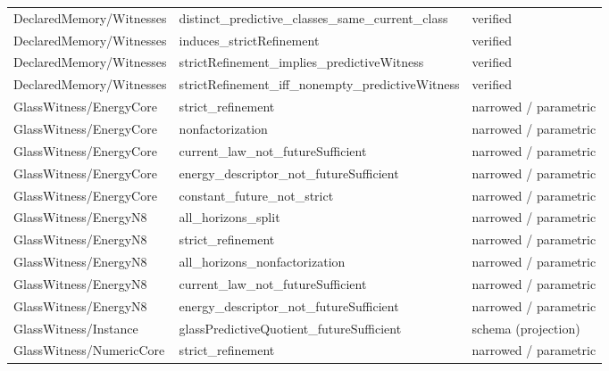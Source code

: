 \begin{longtable}{>{\raggedright\arraybackslash}p{3.6cm}>{\raggedright\arraybackslash}p{8.4cm}p{2.9cm}}
DeclaredMemory/\allowbreak{}Witnesses & distinct\_\allowbreak{}predictive\_\allowbreak{}classes\_\allowbreak{}same\_\allowbreak{}current\_\allowbreak{}class & verified \\
DeclaredMemory/\allowbreak{}Witnesses & induces\_\allowbreak{}strictRefinement & verified \\
DeclaredMemory/\allowbreak{}Witnesses & strictRefinement\_\allowbreak{}implies\_\allowbreak{}predictiveWitness & verified \\
DeclaredMemory/\allowbreak{}Witnesses & strictRefinement\_\allowbreak{}iff\_\allowbreak{}nonempty\_\allowbreak{}predictiveWitness & verified \\
GlassWitness/\allowbreak{}EnergyCore & strict\_\allowbreak{}refinement & narrowed / parametric \\
GlassWitness/\allowbreak{}EnergyCore & nonfactorization & narrowed / parametric \\
GlassWitness/\allowbreak{}EnergyCore & current\_\allowbreak{}law\_\allowbreak{}not\_\allowbreak{}futureSufficient & narrowed / parametric \\
GlassWitness/\allowbreak{}EnergyCore & energy\_\allowbreak{}descriptor\_\allowbreak{}not\_\allowbreak{}futureSufficient & narrowed / parametric \\
GlassWitness/\allowbreak{}EnergyCore & constant\_\allowbreak{}future\_\allowbreak{}not\_\allowbreak{}strict & narrowed / parametric \\
GlassWitness/\allowbreak{}EnergyN8 & all\_\allowbreak{}horizons\_\allowbreak{}split & narrowed / parametric \\
GlassWitness/\allowbreak{}EnergyN8 & strict\_\allowbreak{}refinement & narrowed / parametric \\
GlassWitness/\allowbreak{}EnergyN8 & all\_\allowbreak{}horizons\_\allowbreak{}nonfactorization & narrowed / parametric \\
GlassWitness/\allowbreak{}EnergyN8 & current\_\allowbreak{}law\_\allowbreak{}not\_\allowbreak{}futureSufficient & narrowed / parametric \\
GlassWitness/\allowbreak{}EnergyN8 & energy\_\allowbreak{}descriptor\_\allowbreak{}not\_\allowbreak{}futureSufficient & narrowed / parametric \\
GlassWitness/\allowbreak{}Instance & glassPredictiveQuotient\_\allowbreak{}futureSufficient & schema (projection) \\
GlassWitness/\allowbreak{}NumericCore & strict\_\allowbreak{}refinement & narrowed / parametric \\

\end{longtable}
